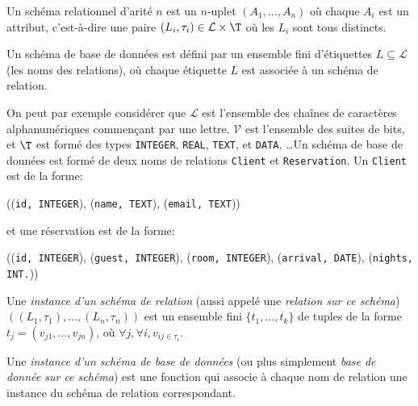 \documentclass[french, toc]{../cs-classes/cs-classes}
\renewcommand*{\L}{\mathcal{L}}
\newcommand*{\V}{\mathcal{V}}
\begin{document}
\begin{definition}
    Un schéma relationnel d'arité $n$ est un $n$-uplet $(A_1, \dots, A_n)$ où chaque $A_i$ est un attribut, c'est-à-dire une paire $(L_i, \tau_i)\in \L\times\T$ où les $L_i$ sont tous distincts.
\end{definition}

\begin{definition}
    Un schéma de base de données est défini par un ensemble fini d'étiquettes $L\subseteq\L$ (les noms des relations), où chaque étiquette $L$ est associée à un schéma de relation.
\end{definition}

\begin{exemple}
    On peut par exemple considérer que $\L$ est l'ensemble des chaînes de caractères alphanumériques commençant par une lettre. $\V$ est l'ensemble des suites de bits, et $\T$ est formé des types \texttt{INTEGER}, \texttt{REAL}, \texttt{TEXT}, et \texttt{DATA}, \dots Un schéma de base de données est formé de deux noms de relations \texttt{Client} et \texttt{Reservation}. Un \texttt{Client} est de la forme:
    \begin{center}
        ((\texttt{id, INTEGER}), (\texttt{name, TEXT}), (\texttt{email, TEXT}))
    \end{center}
    et une réservation est de la forme:
    \begin{center}
        ((\texttt{id, INTEGER}), (\texttt{guest, INTEGER}), (\texttt{room, INTEGER}), (\texttt{arrival, DATE}), (\texttt{nights, INT.}))
    \end{center}
\end{exemple}

\begin{definition}
    Une \emph{instance d'un schéma de relation} (aussi appelé une \emph{relation sur ce schéma}) $((L_1, \tau_1), \dots, (L_n, \tau_n))$ est un ensemble fini $\{t_1, \dots, t_k\}$ de tuples de la forme $t_j=(v_{j1}, \dots, v_{jn})$, où $\forall j, \forall i, v_{ij\in\tau_i}$.
\end{definition}

\begin{definition}
    Une \emph{instance d'un schéma de base de données} (ou plus simplement \emph{base de donnée sur ce schéma}) est une fonction qui associe à chaque nom de relation une instance du schéma de relation correspondant.
\end{definition}
\end{document}
